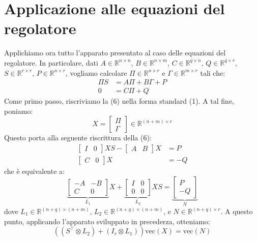 \documentclass[11pt, a4paper]{article}
\begin{document}
\section{Applicazione alle equazioni del regolatore}
Applichiamo ora tutto l'apparato presentato al caso delle equazioni del regolatore. In particolare, dati $A \in \mathbb{R}^{n \times n}$, $B \in \mathbb{R}^{n \times m}$, $C \in \mathbb{R}^{q \times n}$, $Q \in \mathbb{R}^{q \times r}$, $S \in \mathbb{R}^{r \times r}$, $P \in \mathbb{R}^{n \times r}$, vogliamo calcolare $\Pi \in \mathbb{R}^{n \times r}$ e $\Gamma \in \mathbb{R}^{m \times r}$ tali che:
\begin{equation}
\begin{aligned}
\Pi S &= A\Pi + B\Gamma + P \\
0 &= C\Pi + Q
\end{aligned}
\end{equation}
Come primo passo, riscriviamo la (6) nella forma standard (1). A tal fine, poniamo:
\[
X = \begin{bmatrix} \Pi \\ \Gamma \end{bmatrix} \in \mathbb{R}^{(n+m) \times r}
\]
Questo porta alla seguente riscrittura della (6):
\begin{equation}
\begin{aligned}
\begin{bmatrix} I & 0 \end{bmatrix} XS - \begin{bmatrix} A & B \end{bmatrix} X &= P \\
\begin{bmatrix} C & 0 \end{bmatrix} X &= -Q
\end{aligned}
\end{equation}
che è equivalente a:
\begin{equation}
\underbrace{\begin{bmatrix} -A & -B \\ C & 0 \end{bmatrix}}_{L_1} X + \underbrace{\begin{bmatrix} I & 0 \\ 0 & 0 \end{bmatrix}}_{L_2} XS = \underbrace{\begin{bmatrix} P \\ -Q \end{bmatrix}}_{N}
\end{equation}
dove $L_1 \in \mathbb{R}^{(n+q) \times (n+m)}$, $L_2 \in \mathbb{R}^{(n+q) \times (n+m)}$, e $N \in \mathbb{R}^{(n+q) \times r}$. A questo punto, applicando l'apparato sviluppato in precederza, otteniamo:
\begin{equation}
\left( (S^\top \otimes L_2) + (I_r \otimes L_1) \right) \text{vec}(X) = \text{vec}(N)
\end{equation}
\end{document}
